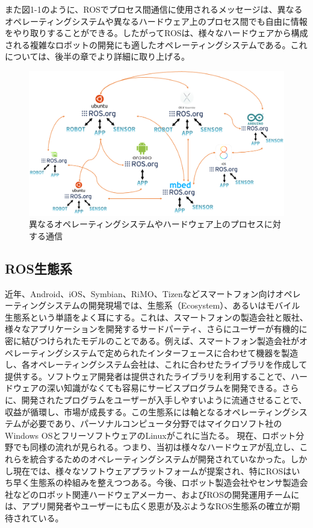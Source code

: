 また図1-1のように、ROSでプロセス間通信に使用されるメッセージは、異なるオペレーティングシステムや異なるハードウェア上のプロセス間でも自由に情報をやり取りすることができる。したがってROSは、様々なハードウェアから構成される複雑なロボットの開発にも適したオペレーティングシステムである。これについては、後半の章でより詳細に取り上げる。

\begin{figure}[h]
  \centering
  \includegraphics[width=\columnwidth]{pictures/chapter1/pic_01_02.png}
  \caption{異なるオペレーティングシステムやハードウェア上のプロセスに対する通信}
\end{figure}

\subsection{ROS生態系}

近年、Android、iOS、Symbian、RiMO、Tizenなどスマートフォン向けオペレーティングシステムの開発現場では、生態系（Ecosystem）、あるいはモバイル生態系という単語をよく耳にする。これは、スマートフォンの製造会社と販社、様々なアプリケーションを開発するサードパーティ、さらにユーザーが有機的に密に結びつけられたモデルのことである。例えば、スマートフォン製造会社がオペレーティングシステムで定められたインターフェースに合わせて機器を製造し、各オペレーティングシステム会社は、これに合わせたライブラリを作成して提供する。ソフトウェア開発者は提供されたライブラリを利用することで、ハードウェアの深い知識がなくても容易にサービスプログラムを開発できる。さらに、開発されたプログラムをユーザーが入手しやすいように流通させることで、収益が循環し、市場が成長する。この生態系には軸となるオペレーティングシステムが必要であり、パーソナルコンピュータ分野ではマイクロソフト社のWindows OSとフリーソフトウェアのLinuxがこれに当たる。
現在、ロボット分野でも同様の流れが見られる。つまり、当初は様々なハードウェアが乱立し、これらを統合するためのオペレーティングシステムが開発されていなかった。しかし現在では、様々なソフトウェアプラットフォームが提案され、特にROSはいち早く生態系の枠組みを整えつつある。今後、ロボット製造会社やセンサ製造会社などのロボット関連ハードウェアメーカー、およびROSの開発運用チームには、アプリ開発者やユーザーにも広く恩恵が及ぶようなROS生態系の確立が期待されている。

